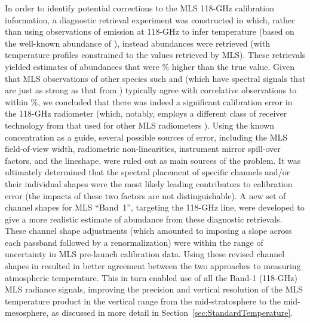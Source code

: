 In order to identify potential corrections to the MLS \mbox{118-GHz} calibration information, a diagnostic retrieval experiment was constructed in which, rather than using observations of  emission at \mbox{118-GHz} to infer temperature (based on the well-known abundance of ), instead  abundances were retrieved (with temperature profiles constrained to the values retrieved by MLS). These retrievals yielded estimates of  abundances that were \% higher than the true value. Given that MLS observations of other species such  and  (which have spectral signals that are just as strong as that from ) typically agree with correlative observations to within \%, we concluded that there was indeed a significant calibration error in the \mbox{118-GHz} radiometer (which, notably, employs a different class of receiver technology from that used for other MLS radiometers \citep{WatersEtal:2006}).  Using the known  concentration as a guide, several possible sources of error, including the MLS field-of-view width, radiometric non-linearities, instrument mirror spill-over factors, and the  lineshape, were ruled out as main sources of the problem.  It was ultimately determined that the spectral placement of specific channels and/or their individual shapes were the most likely leading contributors to calibration error (the impacts of these two factors are not distinguishable).  A new set of channel shapes for MLS ``Band~1'', targeting the \mbox{118-GHz}  line, were developed to give a more realistic estimate of  abundance from these diagnostic retrievals.  These channel shape adjustments (which amounted to imposing a slope across each passband followed by a renormalization) were within the range of uncertainty in MLS pre-launch calibration data.  Using these revised channel shapes in \thisv resulted in better agreement between the two approaches to measuring atmospheric temperature. This in turn enabled use of all the \mbox{Band-1} (\mbox{118-GHz}) MLS radiance signals, improving the precision and vertical resolution of the MLS temperature product in the vertical range from the mid-stratosphere to the mid-mesosphere, as discussed in more detail in Section~\ref{sec:StandardTemperature}.

